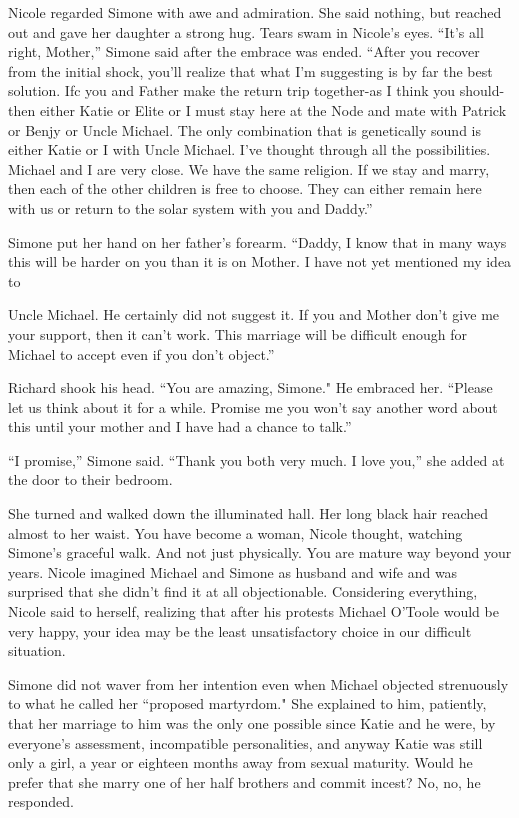 \documentclass[]{article}
\begin{document}
{Nicole regarded Simone with awe and admiration.  She said nothing, but reached out and gave her daughter a strong hug.  Tears swam in Nicole’s eyes.  “It’s all right, Mother,” Simone said after the embrace was ended.  “After you recover from the initial shock, you’ll realize that what I’m suggesting is by far the best solution.  Ifc you and Father make the return trip together-as I think you should-then either Katie or Elite or I must stay here at the Node and mate with Patrick or Benjy or Uncle Michael.  The only combination that is genetically sound is either Katie or I with Uncle Michael.  I’ve thought through all the possibilities.  Michael and I are very close.  We have the same religion.  If we stay and marry, then each of the other children is free to choose.  They can either remain here with us or return to the solar system with you and Daddy.”

Simone put her hand on her father’s forearm.  “Daddy, I know that in many ways this will be harder on you than it is on Mother.  I have not yet mentioned my idea to

Uncle Michael.  He certainly did not suggest it.  If you and Mother don’t give me your support, then it can’t work.  This marriage will be difficult enough for Michael to accept even if you don’t object.”

Richard shook his head.  “You are amazing, Simone."  He embraced her.  “Please let us think about it for a while.  Promise me you won’t say another word about this until your mother and I have had a chance to talk.”

“I promise,” Simone said.  “Thank you both very much.  I love you,” she added at the door to their bedroom.

She turned and walked down the illuminated hall.  Her long black hair reached almost to her waist.  You have become a woman, Nicole thought, watching Simone’s graceful walk.  And not just physically.  You are mature way beyond your years.  Nicole imagined Michael and Simone as husband and wife and was surprised that she didn’t find it at all objectionable.  Considering everything, Nicole said to herself, realizing that after his protests Michael O’Toole would be very happy, your idea may be the least unsatisfactory choice in our difficult situation.

Simone did not waver from her intention even when Michael objected strenuously to what he called her “proposed martyrdom."  She explained to him, patiently, that her marriage to him was the only one possible since Katie and he were, by everyone’s assessment, incompatible personalities, and anyway Katie was still only a girl, a year or eighteen months away from sexual maturity.  Would he prefer that she marry one of her half brothers and commit incest? No, no, he responded.

}
\end{document}
